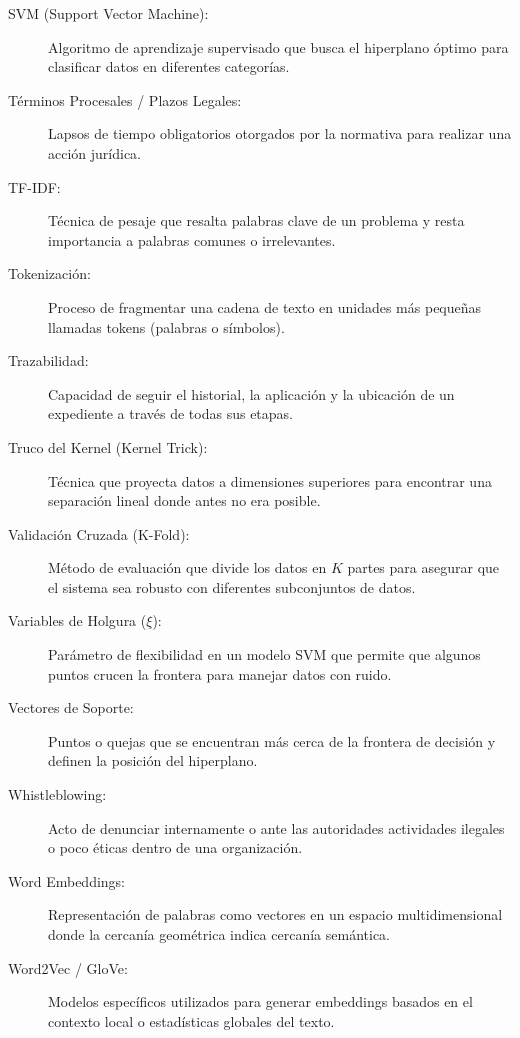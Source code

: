 \begin{description}
    \item[SVM (Support Vector Machine):] Algoritmo de aprendizaje supervisado que busca el hiperplano óptimo para clasificar datos en diferentes categorías.
    \item[Términos Procesales / Plazos Legales:] Lapsos de tiempo obligatorios otorgados por la normativa para realizar una acción jurídica.
    \item[TF-IDF:] Técnica de pesaje que resalta palabras clave de un problema y resta importancia a palabras comunes o irrelevantes.
    \item[Tokenización:] Proceso de fragmentar una cadena de texto en unidades más pequeñas llamadas tokens (palabras o símbolos).
    \item[Trazabilidad:] Capacidad de seguir el historial, la aplicación y la ubicación de un expediente a través de todas sus etapas.
    \item[Truco del Kernel (Kernel Trick):] Técnica que proyecta datos a dimensiones superiores para encontrar una separación lineal donde antes no era posible.
    \item[Validación Cruzada (K-Fold):] Método de evaluación que divide los datos en $K$ partes para asegurar que el sistema sea robusto con diferentes subconjuntos de datos.
    \item[Variables de Holgura ($\xi$):] Parámetro de flexibilidad en un modelo SVM que permite que algunos puntos crucen la frontera para manejar datos con ruido.
    \item[Vectores de Soporte:] Puntos o quejas que se encuentran más cerca de la frontera de decisión y definen la posición del hiperplano.
    \item[Whistleblowing:] Acto de denunciar internamente o ante las autoridades actividades ilegales o poco éticas dentro de una organización.
    \item[Word Embeddings:] Representación de palabras como vectores en un espacio multidimensional donde la cercanía geométrica indica cercanía semántica.
    \item[Word2Vec / GloVe:] Modelos específicos utilizados para generar embeddings basados en el contexto local o estadísticas globales del texto.
\end{description}